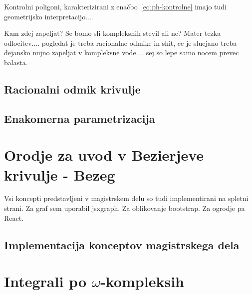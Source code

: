 \documentclass[isrm2, tisk]{fmfdelo}
\begin{document}
    Kontrolni poligoni, karakterizirani z enačbo~\eqref{eq:ph-kontrolne} imajo tudi geometrijsko interpretacijo....

    Kam zdej zapeljat? Se bomo sli kompleksnih stevil ali ne? Mater tezka odlocitev.... pogledat je treba racionalne odmike in shit, ce je slucjano treba dejansko nujno zapeljat v kompleksne vode.... sej so lepe samo nocem prevec balasta.

    \subsection{Racionalni odmik krivulje}

    \subsection{Enakomerna parametrizacija}


    \section{Orodje za uvod v Bezierjeve krivulje - Bezeg}
    Vsi koncepti predstavljeni v magistrskem delu so tudi implementirani na spletni strani.
    Za graf sem uporabil jsxgraph. Za oblikovanje bootstrap. Za ogrodje pa React.

    \subsection{Implementacija konceptov magistrskega dela}






    \newpage



    \newpage
    \newpage
    \newpage


    \section{Integrali po \texorpdfstring{$\omega$}{ω}-kompleksih}
\end{document}
